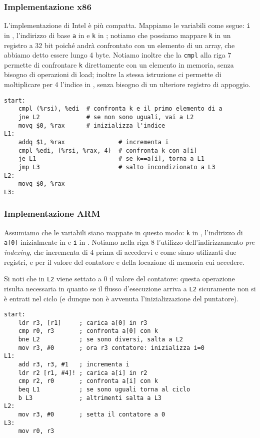 \documentclass[class=book, crop=false, oneside]{standalone}
\begin{document}
\subsubsection{Implementazione x86}
L'implementazione di Intel è più compatta. Mappiamo le variabili come segue: \texttt{i} in , l'indirizzo di base \texttt{a} in  e \texttt{k} in ; notiamo che possiamo mappare \texttt{k} in un registro a 32 bit poiché andrà confrontato con un elemento di un array, che abbiamo detto essere lungo 4 byte.
Notiamo inoltre che la \texttt{cmpl} alla riga \(7\) permette di confrontare \texttt{k} direttamente con un elemento in memoria, senza bisogno di operazioni di load; inoltre la stessa istruzione ci permette di moltiplicare per 4 l'indice in , senza bisogno di un ulteriore registro di appoggio.
\begin{verbatim}
start:
	cmpl (%rsi), %edi  # confronta k e il primo elemento di a
	jne L2             # se non sono uguali, vai a L2
	movq $0, %rax      # inizializza l'indice
L1:
	addq $1, %rax               # incrementa i
	cmpl %edi, (%rsi, %rax, 4)  # confronta k con a[i]
	je L1                       # se k==a[i], torna a L1
	jmp L3                      # salto incondizionato a L3
L2:
	movq $0, %rax
L3:
\end{verbatim}

\subsubsection{Implementazione ARM}
Assumiamo che le variabili siano mappate in questo modo: \texttt{k} in , l'indirizzo di \texttt{a[0]} inizialmente in  e \texttt{i} in . Notiamo nella riga 8 l'utilizzo dell'indirizzamento \emph{pre indexing}, che incrementa  di 4 prima di accedervi e come siano utilizzati due registri,  e  per il valore del contatore e della locazione di memoria cui accedere.

Si noti che in \texttt{L2} viene settato a 0 il valore del contatore: questa operazione risulta necessaria in quanto se il flusso d'esecuzione arriva a \texttt{L2} sicuramente non si è entrati nel ciclo (e dunque non è avvenuta l'inizializzazione del puntatore).
\begin{verbatim}
start:
	ldr r3, [r1]     ; carica a[0] in r3
	cmp r0, r3       ; confronta a[0] con k
	bne L2           ; se sono diversi, salta a L2
	mov r3, #0       ; ora r3 contatore: inizializza i=0
L1:
	add r3, r3, #1   ; incrementa i
	ldr r2 [r1, #4]! ; carica a[i] in r2
	cmp r2, r0       ; confronta a[i] con k
	beq L1           ; se sono uguali torna al ciclo
	b L3             ; altrimenti salta a L3
L2:
	mov r3, #0       ; setta il contatore a 0
L3:
	mov r0, r3
\end{verbatim}
\end{document}
